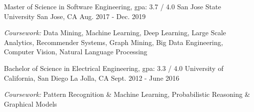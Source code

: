 

\begin{cventries}

  \cventry
    {Master of Science in Software Engineering, gpa: 3.7 / 4.0 } %
    {San Jose State University} %
    {San Jose, CA} %
    {Aug. 2017 - Dec. 2019} %
    {
      \begin{cvitems} %
        \item {\textit{Coursework:} Data Mining, Machine Learning, Deep Learning, Large Scale Analytics, Recommender Systems, Graph Mining, Big Data Engineering, Computer Vision, Natural Language Processing}
      \end{cvitems}
    }
   
  \cventry
    {Bachelor of Science in Electrical Engineering, gpa: 3.3 / 4.0} %
    {University of California, San Diego} %
    {La Jolla, CA} %
    {Sept. 2012 - June 2016} %
    {
      \begin{cvitems} %
        \item {\textit{Coursework:} Pattern Recognition \& Machine Learning, Probabilistic Reasoning \& Graphical Models}
      \end{cvitems}
    }

\end{cventries}
